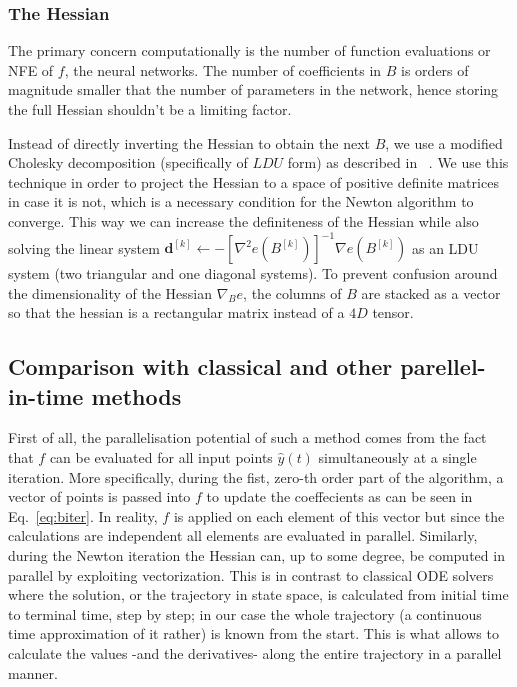 \documentclass[11pt]{report}
\begin{document}
    \subsubsection{The Hessian}

    The primary concern computationally is the number of function evaluations or NFE of $f$,
    the neural networks.
    The number of coefficients in $B$ is orders of magnitude smaller that the number of parameters in the network,
    hence storing the full Hessian shouldn't be a limiting factor.

    Instead of directly inverting the Hessian to obtain the next $B$, we use a modified Cholesky decomposition
    (specifically of $LDU$ form) as described in ~\cite{gill2019practical}.
    We use this technique in order to project the Hessian to a space of positive definite matrices in case it is not,
    which is a necessary condition for the Newton algorithm to converge.
    This way we can increase the definiteness of the Hessian while also solving the linear system
    $\pmb{d}^{[k]} \gets -\left[ \nabla^2 e(B^{[k]}) \right]^{-1} \nabla e(B^{[k]})$ as an LDU system (two triangular
    and one diagonal systems).
    To prevent confusion around the dimensionality of the Hessian $\nabla_{B} e$,
    the columns of $B$ are stacked as a vector so that the hessian is a rectangular matrix instead of a $4D$ tensor.

    \subsection{Comparison with classical and other parellel-in-time methods}
    First of all, the parallelisation potential of such a method comes from the fact that $f$ can be evaluated for all
    input points $\hat y(t)$ simultaneously at a single iteration.
    More specifically, during the fist, zero-th order part of the algorithm, a vector of points is passed into $f$ to
    update the coeffecients as can be seen in Eq.~\eqref{eq:biter}.
    In reality, $f$ is applied on each element of this vector but since the calculations are independent all elements are
    evaluated in parallel.
    Similarly, during the Newton iteration the Hessian can, up to some degree, be computed in parallel by exploiting
    vectorization.
    This is in contrast to classical ODE solvers where the solution, or the trajectory in state space, is calculated from
    initial time to terminal time, step by step; in our case the whole trajectory (a continuous time approximation
    of it rather) is known from the start.
    This is what allows to calculate the values -and the derivatives- along the entire trajectory in a parallel manner.
\end{document}
